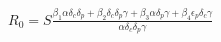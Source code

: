\documentclass[preview]{standalone}
\begin{document}
\begin{center}
$R_0 = S \frac{\beta_1 \alpha \delta_c \delta_p + \beta_2 \delta_c \delta_p \gamma + \beta_3 \alpha \delta_p \gamma + \beta_4 \epsilon_p \delta_c \gamma}{\alpha \delta_c \delta_p \gamma}$
\end{center}
\end{document}
